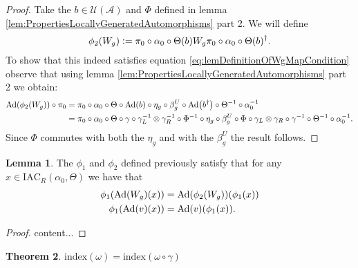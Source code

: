 \documentclass[12pt,a4paper,twoside]{article}
\newcommand{\defeq}{\vcentcolon=}
\let\originalleft\left
\let\originalright\right
\renewcommand{\left}{\mathopen{}\mathclose\bgroup\originalleft}
\renewcommand{\right}{\aftergroup\egroup\originalright}
\newcommand{\UU}{\mathcal U}
\renewcommand{\AA}{\mathcal A}
\newcommand{\Ad}[1]{\textrm{Ad}\left(#1\right)}
\theoremstyle{definition}
\newtheorem{theorem}{Theorem}[section]
\newtheorem{lemma}[theorem]{Lemma}
\numberwithin{equation}{section}
\begin{document}
\begin{proof}
	Take the $b\in\UU(\AA)$ and $\Phi$ defined in lemma \ref{lem:PropertiesLocallyGeneratedAutomorphisms} part 2. We will define
	\begin{equation}
		\phi_2(W_g)\defeq \pi_0\circ\alpha_0\circ\Theta(b)W_g\pi_0\circ\alpha_0\circ\Theta(b)^\dagger.
	\end{equation}
	To show that this indeed satisfies equation \eqref{eq:lemDefinitionOfWgMapCondition} observe that using lemma \ref{lem:PropertiesLocallyGeneratedAutomorphisms} part 2 we obtain:
	\begin{align}
		\Ad{\phi_2(W_g)}\circ\pi_0&=\pi_0\circ \alpha_0\circ\Theta\circ\Ad{b}\circ\eta_g\circ\beta_g^U\circ\Ad{b^{\dagger}}\circ\Theta^{-1}\circ\alpha_0^{-1}\\
		&=\pi_0\circ \alpha_0\circ\Theta\circ\gamma\circ\gamma_L^{-1}\otimes\gamma_R^{-1}\circ\Phi^{-1}\circ\eta_g\circ\beta_g^U\circ\Phi\circ\gamma_L\otimes\gamma_R\circ\gamma^{-1}\circ\Theta^{-1}\circ\alpha_0^{-1}.
	\end{align}
	Since $\Phi$ commutes with both the $\eta_g$ and with the $\beta_g^U$ the result follows.
\end{proof}
\begin{lemma}
	The $\phi_1$ and $\phi_2$ defined previously satisfy that for any $x\in\textrm{IAC}_R(\alpha_0,\Theta)$ we have that
		\begin{align}
			\phi_1(\Ad{W_g}(x))&=\Ad{\phi_2(W_g)}(\phi_1(x))\\
			\phi_1(\Ad{v}(x))&=\Ad{v}(\phi_1(x)).
	\end{align}
\end{lemma}
\begin{proof}
	content...
\end{proof}
\begin{theorem}\label{thrm:IndexInvariantUnderLGA}
	$\textrm{index}(\omega)=\textrm{index}(\omega\circ\gamma)$
\end{theorem}
\end{document}
